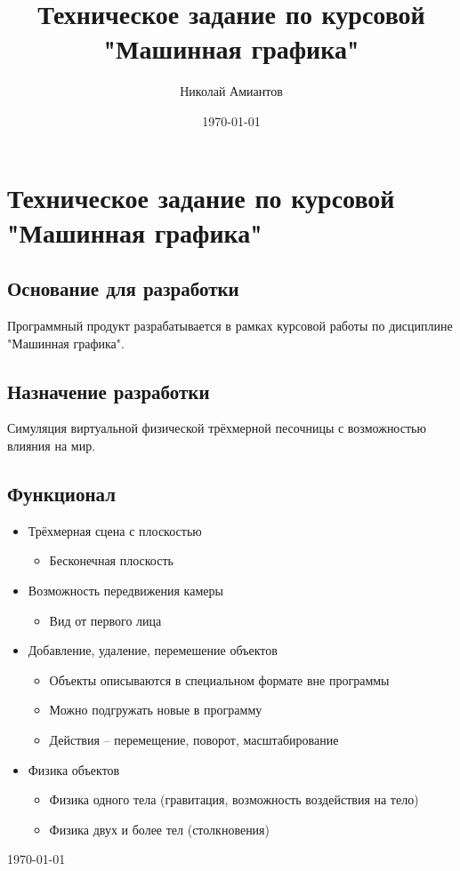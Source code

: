 \documentclass[a4paper,12pt]{article}
\title{Техническое задание по курсовой "Машинная графика"}
\author{Николай Амиантов}
\date{\today}
\begin{document}
\section{Техническое задание по курсовой "Машинная графика"}

\subsection{Основание для разработки}

Программный продукт разрабатывается в рамках курсовой работы по дисциплине "Машинная графика".

\subsection{Назначение разработки}

Симуляция виртуальной физической трёхмерной песочницы с возможностью влияния на мир.

\subsection{Функционал}
\begin{itemize}
  \item Трёхмерная сцена с плоскостью
  \begin{itemize}
    \item Бесконечная плоскость
  \end{itemize}
  \item Возможность передвижения камеры
  \begin{itemize}
    \item Вид от первого лица
  \end{itemize}
  \item Добавление, удаление, перемешение объектов
  \begin{itemize}
    \item Объекты описываются в специальном формате вне программы
    \item Можно подгружать новые в программу
    \item Действия -- перемещение, поворот, масштабирование
  \end{itemize}
  \item Физика объектов
  \begin{itemize}
    \item Физика одного тела (гравитация, возможность воздействия на тело)
    \item Физика двух и более тел (столкновения)
  \end{itemize}
\end{itemize}

\vfill
\today
\end{document}
